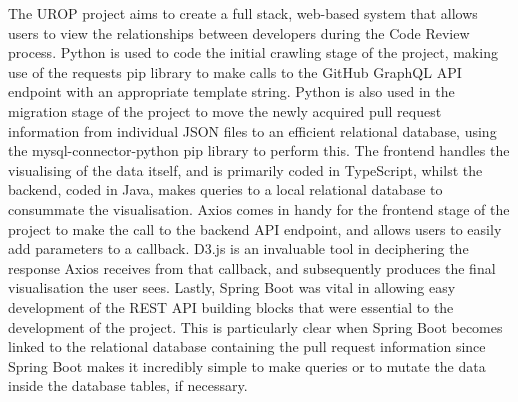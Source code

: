 The UROP project aims to create a full stack,
web-based system that allows users to view the relationships between developers during the Code Review process.
Python is used to code the initial crawling stage of the project,
making use of the requests pip library
to make calls to the GitHub GraphQL API endpoint with an appropriate template string.
Python is also used in the migration stage of the project
to move the newly acquired pull request information from individual JSON files to an efficient relational database,
using the mysql-connector-python pip library to perform this.
The frontend handles the visualising of the data itself, and is primarily coded in TypeScript,
whilst the backend, coded in Java, makes queries to a local relational database to consummate the visualisation.
Axios comes in handy for the frontend stage of the project to make the call to the backend API endpoint,
and allows users to easily add parameters to a callback.
D3.js is an invaluable tool in deciphering the response Axios receives from that callback,
and subsequently produces the final visualisation the user sees.
Lastly,
Spring Boot was vital
in allowing easy development of the REST API building blocks that were essential to the development of the project.
This is particularly clear
when Spring Boot becomes
linked to the relational database
containing the pull request information since Spring Boot makes it incredibly simple
to make queries or to mutate the data inside the database tables,
if necessary.